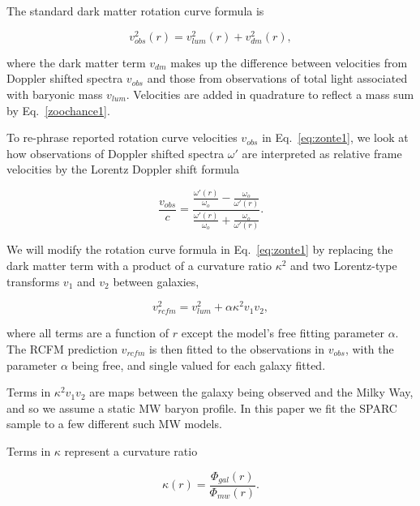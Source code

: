 \documentclass[reprint,%
 amsmath,amssymb,
 aps,
]{revtex4-1}
\begin{document}
  
 The standard dark matter rotation curve formula is

 \begin{equation}
v_{obs}^2 (r)=  v^2_{lum}(r) +  v^2_{dm}(r),  
\label{eq:zonte1}
\end{equation} 

where  the dark matter term $v_{dm}$ makes up the difference between velocities from Doppler shifted spectra  $v_{obs}$ and those from observations of total light associated with baryonic mass $v_{lum}$. Velocities are added in quadrature to reflect a mass sum   by Eq.~\ref{zoochance1}.


 
To re-phrase reported rotation curve velocities $v_{obs}$ in Eq.~\ref{eq:zonte1}, we look at how 
observations of Doppler shifted spectra $\omega'$ are    interpreted   as  relative    frame velocities  by the  Lorentz   Doppler shift formula 
 
 \begin{equation}
 \frac{v_{obs}}{c}=
\frac{  \frac{\omega'(r)}{\omega_o} -  \frac{\omega_o}{\omega'(r)}  }{  \frac{\omega'(r)}{\omega_o}  +  \frac{\omega_o}{\omega'(r)} } . 
\label{eq:modelLumA}
\end{equation} 
 
We will modify
the rotation curve formula in Eq.~\ref{eq:zonte1} by replacing the dark matter term with a product  of a curvature ratio $\kappa^2$ and two Lorentz-type transforms     $v_1$ and $v_2$ between galaxies,   

\begin{equation}
v_{rcfm}^2 =  v_{lum}^2+\alpha \kappa^2 v_{1}v_{2}, 
\label{eq:zonteLCM}
\end{equation}  

 where all terms   are a function of $r$ except the model's free fitting parameter $\alpha$. 
The  RCFM  prediction $v_{rcfm}$ is then fitted to the observations in $v_{obs}$,   with the     parameter $\alpha$ being free, and single valued for each galaxy    fitted. 

Terms in $ \kappa^2 v_{1}v_{2}$ are   maps between the galaxy being observed and the Milky Way, and so we   assume a static MW baryon profile. In this paper we fit the SPARC sample to  a few different such MW models. 



 Terms in $\kappa$ 
 represent a  
curvature ratio  

 \begin{equation}
\kappa(r)=\frac{\Phi_{gal}(r)}{\Phi_{mw}(r)}.  
\label{eq:kappa2}  
\end{equation}  
 
\end{document}

